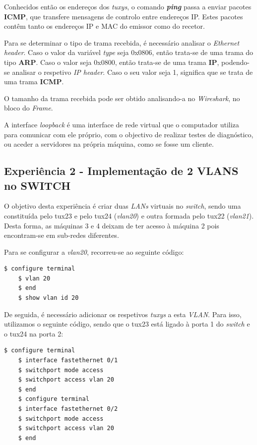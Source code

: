 \documentclass[11pt]{article}
\begin{document}
Conhecidos então os endereços dos \textit{tuxys}, o comando \textit{\textbf{ping}} passa a enviar pacotes \textbf{ICMP}, que transfere mensagens de controlo entre endereços IP. Estes pacotes contêm tanto os endereços IP e MAC do emissor como do recetor.

Para se determinar o tipo de trama recebida, é necessário analisar o \textit{Ethernet header}. Caso o valor da variável \textit{type} seja 0x0806, então trata-se de uma trama do tipo \textbf{ARP}. Caso o valor seja 0x0800, então trata-se de uma trama \textbf{IP}, podendo-se analisar o respetivo \textit{IP header}. Caso o seu valor seja 1, significa que se trata de uma trama \textbf{ICMP}.

O tamanho da trama recebida pode ser obtido analisando-a no \textit{Wireshark}, no bloco do \textit{Frame}.

A interface \textit{loopback} é uma interface de rede virtual que o computador utiliza para comunicar com ele próprio, com o objectivo de realizar testes de diagnóstico, ou aceder a servidores na própria máquina, como se fosse um cliente.

\subsection{Experiência 2 - Implementação de 2 VLANS no SWITCH}

O objetivo desta experiência é criar duas \textit{LANs} virtuais no \textit{switch}, sendo uma constituída pelo tux23 e pelo tux24 (\textit{vlan20}) e outra formada pelo tux22 (\textit{vlan21}). Desta forma, as máquinas 3 e 4 deixam de ter acesso à máquina 2 pois encontram-se em sub-redes diferentes.

Para se configurar a \textit{vlan20}, recorreu-se ao seguinte código: 

\begin{lstlisting}[language=bash]
    $ configure terminal
    $ vlan 20
    $ end
    $ show vlan id 20
\end{lstlisting}

De seguida, é necessário adicionar os respetivos \textit{tuxys} a esta \textit{VLAN}. Para isso, utilizamos o seguinte código, sendo que o tux23 está ligado à porta 1 do \textit{switch} e o tux24 na porta 2:

\begin{lstlisting}[language=bash]
    $ configure terminal
    $ interface fastethernet 0/1
    $ switchport mode access
    $ switchport access vlan 20
    $ end
    $ configure terminal
    $ interface fastethernet 0/2            
    $ switchport mode access
    $ switchport access vlan 20
    $ end
\end{lstlisting}
\end{document}

